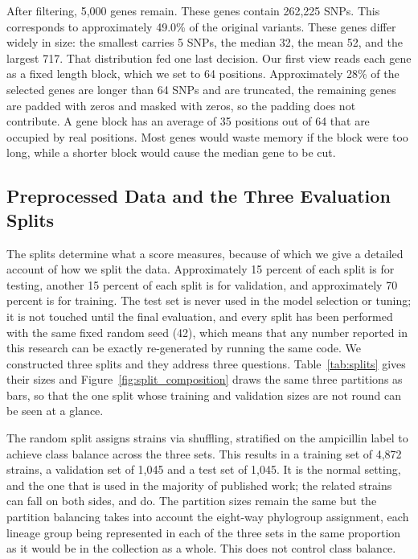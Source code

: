 After filtering, 5,000 genes remain. These genes contain 262,225 SNPs. This corresponds to
approximately 49.0\% of the original variants. These genes differ widely in size: the smallest carries 5 SNPs, the median
32, the mean 52, and the largest 717. That distribution fed one last decision. Our first view
reads each gene as a fixed length block, which we set to 64 positions. Approximately 28\% of
the selected genes are longer than 64 SNPs and are truncated, the remaining genes are padded
with zeros and masked with zeros, so the padding does not contribute. A gene block has an
average of 35 positions out of 64 that are occupied by real positions. Most genes would waste
memory if the block were too long, while a shorter block would cause the median gene to be
cut.

\FloatBarrier
\subsection{Preprocessed Data and the Three Evaluation Splits}
\label{subsec:splits}

The splits determine what a score measures, because of which we give a detailed account of
how we split the data. Approximately 15 percent of each split is for testing, another 15
percent of each split is for validation, and approximately 70 percent is for training. The
test set is never used in the model selection or tuning; it is not touched until the final
evaluation, and every split has been performed with the same fixed random seed (42), which
means that any number reported in this research can be exactly re-generated by running the same
code. We constructed three splits and they address three questions.
Table~\ref{tab:splits} gives their sizes and
Figure~\ref{fig:split_composition} draws the same three partitions as bars, so
that the one split whose training and validation sizes are not round can be seen at
a glance.

\vspace{1em}

The random split assigns strains via shuffling, stratified on the ampicillin label to achieve
class balance across the three sets. This results in a training set of 4,872 strains, a
validation set of 1,045 and a test set of 1,045. It is the normal setting, and the one that is
used in the majority of published work; the related strains can fall on both sides, and do.
The partition sizes remain the same but the partition balancing takes into account the
eight-way phylogroup assignment, each lineage group being represented in each of the three
sets in the same proportion as it would be in the collection as a whole. This does not control
class balance.

